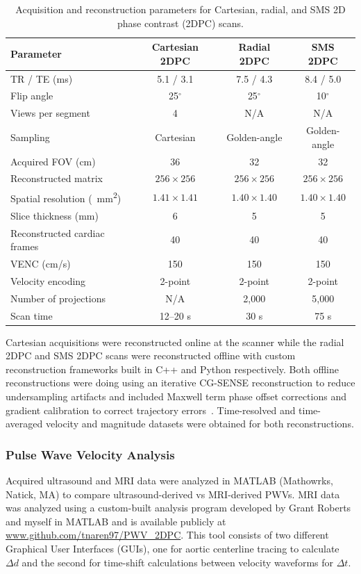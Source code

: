 \begin{table}[ht]
    \centering
    \caption[2D phase contrast can parameters]{Acquisition and reconstruction parameters for Cartesian, radial, and SMS 2D phase contrast (2DPC) scans.}\label{tab:scan_params}
    \begin{tabular}{lccc}
    \toprule
    Parameter & Cartesian 2DPC & Radial 2DPC & SMS 2DPC \\
    \midrule
    TR / TE (ms) & 5.1 / 3.1 & 7.5 / 4.3 & 8.4 / 5.0 \\
    Flip angle & 25$^\circ$ & 25$^\circ$ & 10$^\circ$ \\
    Views per segment & 4 & N/A & N/A \\
    Sampling & Cartesian & Golden-angle & Golden-angle \\
    Acquired FOV (cm) & 36 & 32 & 32 \\
    Reconstructed matrix & $256 \times 256$ & $256 \times 256$ & $256 \times 256$ \\
    Spatial resolution (\qty{}{\mm^2}) & $1.41 \times 1.41$ & $1.40 \times 1.40$ & $1.40 \times 1.40$ \\
    Slice thickness (mm) & 6 & 5 & 5 \\
    Reconstructed cardiac frames & 40 & 40 & 40 \\
    VENC (cm/s) & 150 & 150 & 150 \\
    Velocity encoding & 2-point & 2-point & 2-point \\
    Number of projections & N/A & 2,000 & 5,000 \\
    Scan time & 12--20 s & 30 s & 75 s \\
    \bottomrule
    \end{tabular}
\end{table}

Cartesian acquisitions were reconstructed online at the scanner while the radial 2DPC and SMS 2DPC scans were reconstructed offline with custom reconstruction frameworks built in C++ and Python respectively. Both offline reconstructions were doing using an iterative CG-SENSE reconstruction to reduce undersampling artifacts and included Maxwell term phase offset corrections and gradient calibration to correct trajectory errors~\cite{pruessmann2001, bernsteinConcomitantGradientTerms1998, johnsonImproved3DPhase2008}. Time-resolved and time-averaged velocity and magnitude datasets were obtained for both reconstructions.

\subsubsection{Pulse Wave Velocity Analysis}
Acquired ultrasound and MRI data were analyzed in MATLAB (Mathowrks, Natick, MA) to compare ultrasound-derived vs MRI-derived PWVs. MRI data was analyzed using a custom-built analysis program developed by Grant Roberts and myself in MATLAB and is available publicly at \url{www.github.com/tnaren97/PWV_2DPC}. This tool consists of two different Graphical User Interfaces (GUIs), one for aortic centerline tracing to calculate $\Delta d$ and the second for time-shift calculations between velocity waveforms for $\Delta t$.

